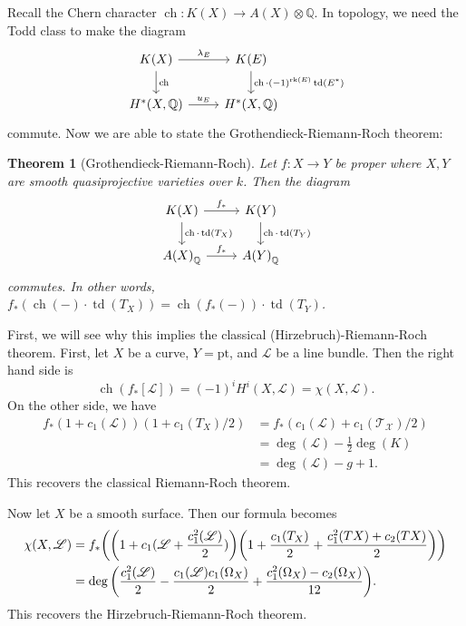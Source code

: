 \documentclass[leqno, openany]{memoir}
\newtheorem{thm}{Theorem}[section]
\theoremstyle{definition}
\theoremstyle{remark}
\theoremstyle{plain}
\theoremstyle{definition}
\theoremstyle{remark}
\newcommand{\Q}{\mathbb{Q}}
\newcommand{\msc}[1]{\mathscr{#1}}
\newcommand{\mr}[1]{\mathrm{#1}}
\DeclareMathOperator{\ch}{ch}
\DeclareMathOperator{\td}{td}
\begin{document}
Recall the Chern character $\ch \colon K(X) \to A(X) \otimes \Q$. In topology, we need the Todd class to make the diagram
\begin{equation*}
\begin{tikzcd}
    K(X) \ar{r}{\lambda_E} \ar{d}{\ch} & K(E) \ar{d}{\ch \cdot {(-1)}^{\mr{rk}(E)} \td(E^*)} \\
    H^*(X, \Q) \ar{r}{u_E} & H^*(X, \Q)
\end{tikzcd}
\end{equation*}
commute. Now we are able to state the Grothendieck-Riemann-Roch theorem:

\begin{thm}[Grothendieck-Riemann-Roch]
    Let $f \colon X \to Y$ be proper where $X, Y$ are smooth quasiprojective varieties over $k$. Then the diagram
    \begin{equation*}
    \begin{tikzcd}
        K(X) \ar{r}{f_*} \ar{d}{\ch \cdot \td(T_X)} & K(Y) \ar{d}{\ch \cdot \td(T_Y)} \\
        {A(X)}_{\Q} \ar{r}{f_*} & {A(Y)}_{\Q}
    \end{tikzcd}
    \end{equation*}
    commutes. In other words, $f_*(\ch(-) \cdot \td(T_X)) = \ch(f_*(-)) \cdot \td(T_Y)$.
\end{thm}

First, we will see why this implies the classical (Hirzebruch)-Riemann-Roch theorem. First, let $X$ be a curve, $Y = \mr{pt}$, and $\msc{L}$ be a line bundle. Then the right hand side is 
\[ \ch(f_* [\msc{L}]) = {(-1)}^i H^i(X, \msc{L}) = \chi(X, \msc{L}). \]
On the other side, we have
\begin{align*}
    f_* (1 + c_1(\msc{L})) ( 1 + c_1(T_X)/2 ) &= f_*(c_1(\msc{L}) + c_1(\msc{T_X})/2) \\
                                              &= \deg(\msc{L}) - \frac{1}{2} \deg(K) \\
                                              &= \deg(\msc{L}) - g + 1.
\end{align*}
This recovers the classical Riemann-Roch theorem.

Now let $X$ be a smooth surface. Then our formula becomes
\begin{align*}
    \chi(X, \msc{L}) &= f_* \qty( \qty(1 + c_1(\msc{L} + \frac{c_1^2(\msc{L})}{2})) \qty(1 + \frac{c_1(T_X)}{2} + \frac{c_1^2(TX) + c_2(TX)}{2}) ) \\
                     &= \deg \qty( \frac{c_1^2(\msc{L})}{2} - \frac{c_1(\msc{L}) c_1(\Omega_X)}{2} + \frac{c_1^2(\Omega_X) - c_2(\Omega_X)}{12} ). 
\end{align*} 
This recovers the Hirzebruch-Riemann-Roch theorem.
\end{document}
